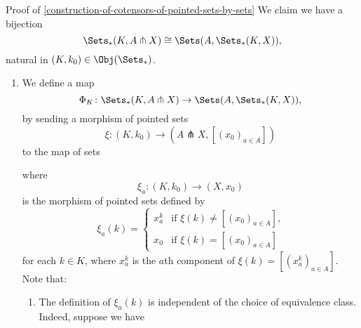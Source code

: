 \begin{Proof}{Proof of \cref{construction-of-cotensors-of-pointed-sets-by-sets}}%
    We claim we have a bijection
    \[
         \Sets_{*}(K,A\pitchfork X)%
         \cong%
         \Sets(A,\Sets_{*}(K,X)),%
    \]%
    natural in $(K,k_{0})\in\Obj(\Sets_{*})$.%
    \begin{enumerate}
        \item\label{proof-of-construction-of-cotensors-of-pointed-sets-by-sets-1}We define a map
            \[
                \Phi_{K}%
                \colon%
                \Sets_{*}(K,A\pitchfork X)%
                \to%
                \Sets(A,\Sets_{*}(K,X)),%
            \]%
            by sending a morphism of pointed sets
            \[
                \xi%
                \colon%
                (K,k_{0})%
                \to%
                (A\pitchfork X,[(x_{0})_{a\in A}])%
            \]%
            to the map of sets%
            \begin{webcompile}
                \phantom{\xi^{\dagger}\colon}
            \end{webcompile}
            where
            \[
                \xi_{a}%
                \colon%
                (K,k_{0})%
                \to%
                (X,x_{0})%
            \]%
            is the morphism of pointed sets defined by
            \[
                \xi_{a}(k)%
                =%
                \begin{cases}
                    x^{k}_{a} &\text{if $\xi(k)\neq[(x_{0})_{a\in A}]$,}\\%
                    x_{0}     &\text{if $\xi(k)=[(x_{0})_{a\in A}]$}%
                \end{cases}
            \]%
            for each $k\in K$, where $x^{k}_{a}$ is the $a$th component of $\xi(k)=[(x^{k}_{a})_{a\in A}]$. Note that:
            \begin{enumerate}
                \item\label{proof-of-construction-of-cotensors-of-pointed-sets-by-sets-1a}The definition of $\xi_{a}(k)$ is independent of the choice of equivalence class. Indeed, suppose we have

\end{enumerate}
\end{enumerate}
\end{Proof}
